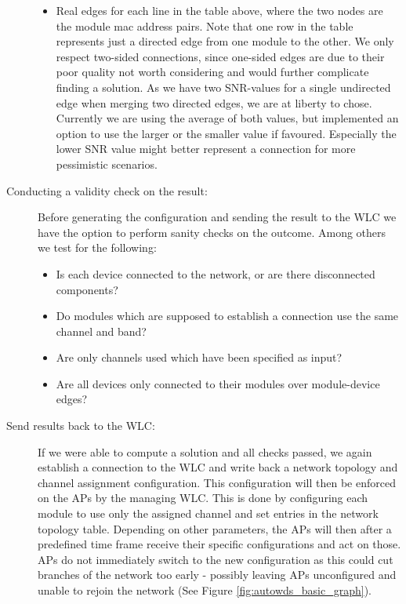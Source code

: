 \begin{description}
\begin{itemize}
	    \item Real edges for each line in the table above, where the two nodes are the module mac address pairs. 
	      Note that one row in the table represents just a directed edge from one module to the other. 
	      We only respect two-sided connections, since one-sided edges are due to their poor quality not worth considering and would further complicate finding a solution.
	      As we have two \ac{SNR}-values for a single undirected edge when merging two directed edges, we are at liberty to chose.
	      Currently we are using the average of both values, but implemented an option to use the larger or the smaller value if favoured.
	      Especially the lower \ac{SNR} value might better represent a connection for more pessimistic scenarios.
	  \end{itemize}

	\item[Conducting a validity check on the result:\newline]
	  Before generating the configuration and sending the result to the \ac{WLC} we have the option to perform sanity checks on the outcome.
	  Among others we test for the following:
	  \begin{itemize}
	    \item Is each device connected to the network, or are there disconnected components?
	    \item Do modules which are supposed to establish a connection use the same channel and band?
	    \item Are only channels used which have been specified as input?
	    \item Are all devices only connected to their modules over module-device edges?
	  \end{itemize}
	  
	\item [Send results back to the \ac{WLC}:]
	  If we were able to compute a solution and all checks passed, we again establish a 
	  connection to the \ac{WLC} and write back a network topology and channel assignment configuration.
	  This configuration will then be enforced on the APs by the managing \ac{WLC}.
	  This is done by configuring each module to use only the assigned channel and set entries in the network topology table. 
	  Depending on other parameters, the APs will then after a predefined time frame receive their specific configurations and act on those.
	  APs do not immediately switch to the new configuration as this could cut branches of the network too early - possibly leaving APs 
	  unconfigured and unable to rejoin the network (See Figure \ref{fig:autowds_basic_graph}).
	  
      \end{description}
      
